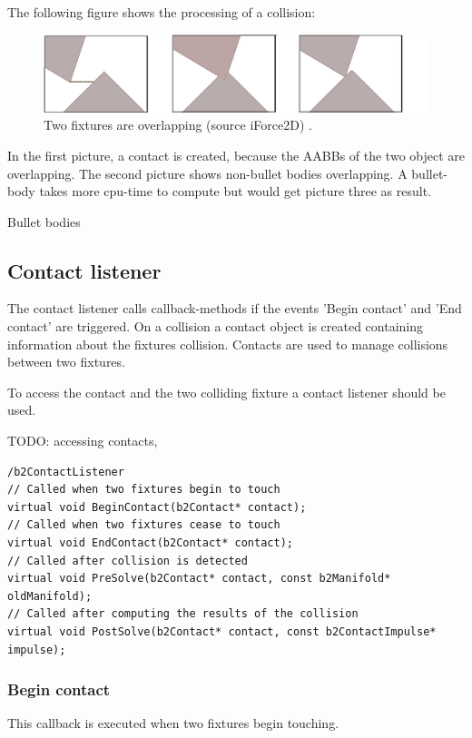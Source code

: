 \documentclass[10pt,a4paper,DIV=11]{scrreprt}
\begin{document}
The following figure shows the processing of a collision:

\begin{center}
	\begin{figure}[H]
		\centering
		\includegraphics[width=1.0\textwidth,scale=1.0]{files/fixtures-overlap.png}
		\caption{Two fixtures are overlapping (source iForce2D) \cite{box2d-iforce}.}
		\label{fig:fixture-overlap}
	\end{figure}
\end{center}

In the first picture, a contact is created, because the AABBs of the two object are overlapping.
The second picture shows non-bullet bodies overlapping. A bullet-body takes more cpu-time to compute but would get picture three as result.

Bullet bodies

\subsection{Contact listener}
The contact listener calls callback-methods if the events 'Begin contact' and 'End contact' are triggered.
On a collision a contact object is created containing information about the fixtures collision.
Contacts are used to manage collisions between two fixtures.

To access the contact and the two colliding fixture a contact listener should be used.

TODO: accessing contacts, 


\begin{lstlisting}[caption={Contact listener methods},label=lst:collision-contact]
/b2ContactListener
// Called when two fixtures begin to touch
virtual void BeginContact(b2Contact* contact);
// Called when two fixtures cease to touch
virtual void EndContact(b2Contact* contact);
// Called after collision is detected
virtual void PreSolve(b2Contact* contact, const b2Manifold* oldManifold);
// Called after computing the results of the collision
virtual void PostSolve(b2Contact* contact, const b2ContactImpulse* impulse);
\end{lstlisting}

\subsubsection*{Begin contact}
This callback is executed when two fixtures begin touching.
\end{document}
